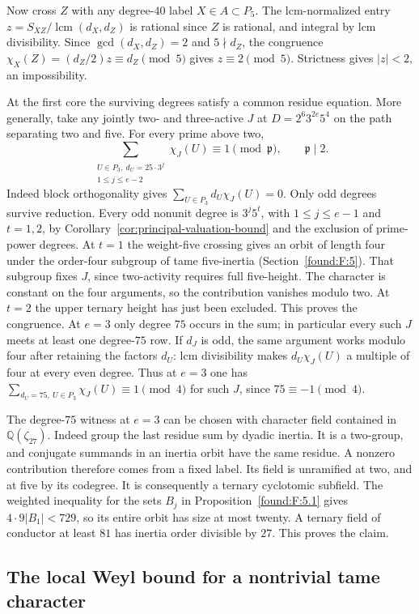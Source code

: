 \documentclass[11pt,a4paper]{article}
\numberwithin{equation}{section}
\theoremstyle{remark}
\newcommand{\QQ}{\mathbb Q}
\begin{document}
Now cross $Z$ with any degree-$40$ label $X\in A\subset P_5$. The lcm-normalized entry $z=S_{XZ}/\operatorname{lcm}(d_X,d_Z)$ is rational since $Z$ is rational, and integral by lcm divisibility. Since $\gcd(d_X,d_Z)=2$ and $5\nmid d_Z$, the congruence $\chi_X(Z)=(d_Z/2)z\equiv d_Z\pmod5$ gives $z\equiv2\pmod5$. Strictness gives $|z|<2$, an impossibility.

At the first core the surviving degrees satisfy a common residue equation. More generally, take any jointly two- and three-active $J$ at $D=2^6 3^{2e}5^4$ on the path separating two and five. For every prime above two,
\[
 \sum_{\substack{U\in P_3,\ d_U=25\cdot3^j\\1\le j\le e-2}}\chi_J(U)
 \equiv1\pmod{\mathfrak p},\qquad \mathfrak p\mid2.
\]
Indeed block orthogonality gives $\sum_{U\in P_3}d_U\chi_J(U)=0$. Only odd degrees survive reduction. Every odd nonunit degree is $3^j5^t$, with $1\le j\le e-1$ and $t=1,2$, by Corollary~\ref{cor:principal-valuation-bound} and the exclusion of prime-power degrees. At $t=1$ the weight-five crossing gives an orbit of length four under the order-four subgroup of tame five-inertia (Section~\ref{found:F:5}). That subgroup fixes $J$, since two-activity requires full five-height. The character is constant on the four arguments, so the contribution vanishes modulo two. At $t=2$ the upper ternary height has just been excluded. This proves the congruence. At $e=3$ only degree $75$ occurs in the sum; in particular every such $J$ meets at least one degree-$75$ row.
If $d_J$ is odd, the same argument works modulo four after retaining the factors $d_U$: lcm divisibility makes $d_U\chi_J(U)$ a multiple of four at every even degree. Thus at $e=3$ one has $\sum_{d_U=75,\ U\in P_3}\chi_J(U)\equiv1\pmod4$ for such $J$, since $75\equiv-1\pmod4$.

The degree-$75$ witness at $e=3$ can be chosen with character field contained in $\QQ(\zeta_{27})$. Indeed group the last residue sum by dyadic inertia. It is a two-group, and conjugate summands in an inertia orbit have the same residue. A nonzero contribution therefore comes from a fixed label. Its field is unramified at two, and at five by its codegree. It is consequently a ternary cyclotomic subfield. The weighted inequality for the sets $B_j$ in Proposition~\ref{found:F:5.1} gives $4\cdot9|B_1|<729$, so its entire orbit has size at most twenty. A ternary field of conductor at least $81$ has inertia order divisible by $27$. This proves the claim.

\subsection{The local Weyl bound for a nontrivial tame character}\label{found:P:2}
\label{found:P:key:sect:weyl}
\end{document}
